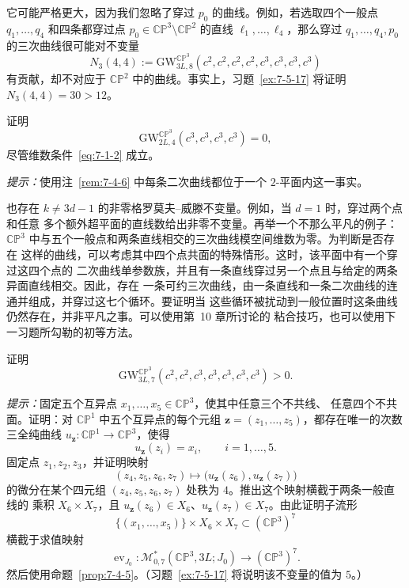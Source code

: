 \begin{remark}
它可能严格更大，因为我们忽略了穿过 $p_0$ 的曲线。例如，若选取四个一般点
$q_1,\ldots,q_4$ 和四条都穿过点
$p_0\in\mathbb{CP}^3\setminus\mathbb{CP}^2$ 的直线
$\ell_1,\ldots,\ell_4$，那么穿过 $q_1,\ldots,q_4,p_0$ 的三次曲线很可能对不变量
\[
  N_3(4,4):=
  \mathrm{GW}^{\mathbb{CP}^3}_{3L,8}
  (c^2,c^2,c^2,c^2,c^3,c^3,c^3,c^3)
\]
有贡献，却不对应于 $\mathbb{CP}^2$ 中的曲线。事实上，习题~\ref{ex:7-5-17} 将证明
$N_3(4,4)=30>12$。
\end{remark}

\begin{exercise}\label{ex:7-4-11}
证明
\[
  \mathrm{GW}^{\mathbb{CP}^3}_{2L,4}(c^3,c^3,c^3,c^3)=0,
\]
尽管维数条件~\eqref{eq:7-1-2} 成立。

\emph{提示：}使用注~\ref{rem:7-4-6} 中每条二次曲线都位于一个 $2$-平面内这一事实。
\end{exercise}

也存在 $k\ne3d-1$ 的非零格罗莫夫--威滕不变量。例如，当 $d=1$ 时，穿过两个点和任意
多个额外超平面的直线数给出非零不变量。再举一个不那么平凡的例子：
$\mathbb{CP}^3$ 中与五个一般点和两条直线相交的三次曲线模空间维数为零。为判断是否存在
这样的曲线，可以考虑其中四个点共面的特殊情形。这时，该平面中有一个穿过这四个点的
二次曲线单参数族，并且有一条直线穿过另一个点且与给定的两条异面直线相交。因此，存在
一条可约三次曲线，由一条直线和一条二次曲线的连通并组成，并穿过这七个循环。要证明当
这些循环被扰动到一般位置时这条曲线仍然存在，并非平凡之事。可以使用第~10 章所讨论的
粘合技巧，也可以使用下一习题所勾勒的初等方法。

\begin{exercise}\label{ex:7-4-12}
证明
\[
  \mathrm{GW}^{\mathbb{CP}^3}_{3L,7}
  (c^2,c^2,c^3,c^3,c^3,c^3,c^3)>0.
\]

\emph{提示：}固定五个互异点 $x_1,\ldots,x_5\in\mathbb{CP}^3$，使其中任意三个不共线、
任意四个不共面。证明：对 $\mathbb{CP}^1$ 中五个互异点的每个元组
$\mathbf z=(z_1,\ldots,z_5)$，都存在唯一的次数三全纯曲线
$u_{\mathbf z}:\mathbb{CP}^1\to\mathbb{CP}^3$，使得
\[
  u_{\mathbf z}(z_i)=x_i,
  \qquad i=1,\ldots,5.
\]
固定点 $z_1,z_2,z_3$，并证明映射
\[
  (z_4,z_5,z_6,z_7)
  \longmapsto
  \bigl(u_{\mathbf z}(z_6),u_{\mathbf z}(z_7)\bigr)
\]
的微分在某个四元组 $(z_4,z_5,z_6,z_7)$ 处秩为 $4$。推出这个映射横截于两条一般直线的
乘积 $X_6\times X_7$，且
$u_{\mathbf z}(z_6)\in X_6$、$u_{\mathbf z}(z_7)\in X_7$。由此证明子流形
\[
  \{(x_1,\ldots,x_5)\}\times X_6\times X_7
  \subset(\mathbb{CP}^3)^7
\]
横截于求值映射
\[
  \operatorname{ev}_{J_0}:
  \mathcal M^*_{0,7}(\mathbb{CP}^3,3L;J_0)
  \longrightarrow(\mathbb{CP}^3)^7.
\]
然后使用命题~\ref{prop:7-4-5}。（习题~\ref{ex:7-5-17} 将说明该不变量的值为 $5$。）
\end{exercise}

